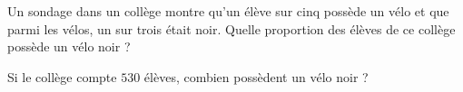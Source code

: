 
\begin{exercice}\label{exo2smath-0034}

    Un sondage dans un collège montre qu'un élève sur cinq possède un vélo et que parmi les vélos, un sur trois était noir. Quelle proportion des élèves de ce collège possède un vélo noir ?

    Si le collège compte \( 530\) élèves, combien possèdent un vélo noir ?

\end{exercice}
